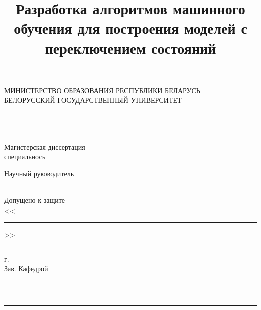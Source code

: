\documentclass[a4paper,14pt]{extreport}
\title{Разработка алгоритмов машинного обучения для построения моделей с переключением состояний}
\author{\@authorlast \@authorfirst}
\makeatletter
\newcommand*{\@authorfirst}{}
\newcommand*{\@authorlast}{}
\newcommand*{\@mentor}{}
\newcommand*{\@mentorjob}{}
\newcommand*{\@faculty}{}
\newcommand*{\@subfaculty}{}
\newcommand*{\@specialty}{}
\makeatother
\begin{document}

\begin{titlepage}
	\begin{center}
		\small{МИНИСТЕРСТВО ОБРАЗОВАНИЯ РЕСПУБЛИКИ БЕЛАРУСЬ}\\
		\small{БЕЛОРУССКИЙ ГОСУДАРСТВЕННЫЙ УНИВЕРСИТЕТ}\\
		\small{\MakeUppercase{\@faculty}}\\
		\@subfaculty
	\end{center}
																																																																																								  
	\vspace{5em}
																																																																																								  
	\begin{center}
		\MakeUppercase{\@authorlast} \@authorfirst \\
		\vspace{1em}
		\textbf{\MakeUppercase{\@title}} \\
		\vspace{2em}
		Магистерская диссертация \\
		специальнось \@specialty
	\end{center}
																																																																																								
	\vspace{2em}
	\begin{flushright}
		\begin{minipage}[H]{0.4\textwidth}
			\begin{flushleft}
				Научный руководитель \\
				\@mentor \\
				\@mentorjob
			\end{flushleft}
		\end{minipage}
	\end{flushright}
																																																																													
	\vspace{3em}
																																																																													
	\vfill
																																																																															
	\begin{flushleft}
		\begin{minipage}[H]{0.5\textwidth}
			\begin{flushleft}
				Допущено к защите \\
				<<\rule{1cm}{1pt}>> \rule{4cm}{1pt} \the\year г. \\
				Зав. Кафедрой \\
				\rule{6cm}{1pt} \\
				\rule{6cm}{1pt}
			\end{flushleft}
		\end{minipage}
	\end{flushleft}
																																																																																								

\end{titlepage}
\end{document}
